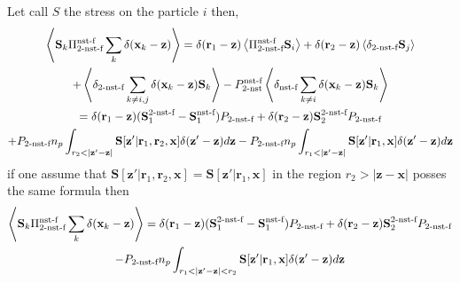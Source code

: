 Let call $S$ the stress on the particle $i$ then,
\begin{multline}
    \left<\textbf{S}_k\Pi_\text{2-nst-f}^\text{nst-f} \sum_k \delta(\textbf{x}_k - \textbf{z}) \right>
    =
    \delta(\textbf{r}_1 - \textbf{z}) \left<\Pi_\text{2-nst-f}^\text{nst-f}  \textbf{S}_i\right>
    +\delta(\textbf{r}_2 - \textbf{z}) \left<\delta_\text{2-nst-f} \textbf{S}_j\right>\\
    + \left<\delta_\text{2-nst-f} \sum_{k\neq i,j} \delta(\textbf{x}_k - \textbf{z}) \textbf{S}_k \right>
    - P^\text{nst-f}_\text{2-nst} \left<\delta_\text{nst-f} \sum_{k\neq i} \delta(\textbf{x}_k - \textbf{z}) \textbf{S}_k \right>\\
    = 
    \delta(\textbf{r}_1 - \textbf{z}) (\textbf{S}_{1}^\text{2-nst-f} - \textbf{S}_{1}^\text{nst-f}) P_\text{2-nst-f}
    + \delta(\textbf{r}_2 - \textbf{z}) \textbf{S}_2^\text{2-nst-f} P_\text{2-nst-f}\\
    + P_\text{2-nst-f} n_p \int_{r_2 < |\textbf{z}' - \textbf{z}|}\textbf{S}[\textbf{z}'|\textbf{r}_1,\textbf{r}_2,\textbf{x}]\delta(\textbf{z}'-\textbf{z})d\textbf{z}
    - P_\text{2-nst-f} n_p \int_{r_1 < |\textbf{z}' - \textbf{z}|}\textbf{S}[\textbf{z}'|\textbf{r}_1,\textbf{x}] \delta(\textbf{z}'-\textbf{z}) d\textbf{z}
\end{multline}
if one assume that $\textbf{S}[\textbf{z}'|\textbf{r}_1,\textbf{r}_2,\textbf{x}] = \textbf{S}[\textbf{z}'|\textbf{r}_1,\textbf{x}]$ in the region $r_2 > |\textbf{z}-\textbf{x}|$ posses the same formula then 
\begin{multline}
    \left<\textbf{S}_k\Pi_\text{2-nst-f}^\text{nst-f} \sum_k \delta(\textbf{x}_k - \textbf{z}) \right>
    =
    \delta(\textbf{r}_1 - \textbf{z}) (\textbf{S}_{1}^\text{2-nst-f} - \textbf{S}_{1}^\text{nst-f}) P_\text{2-nst-f}
    + \delta(\textbf{r}_2 - \textbf{z}) \textbf{S}_2^\text{2-nst-f} P_\text{2-nst-f}\\
    - P_\text{2-nst-f} n_p \int_{r_1 < |\textbf{z}' - \textbf{z}|<r_2}\textbf{S}[\textbf{z}'|\textbf{r}_1,\textbf{x}] \delta(\textbf{z}'-\textbf{z}) d\textbf{z}
\end{multline}
